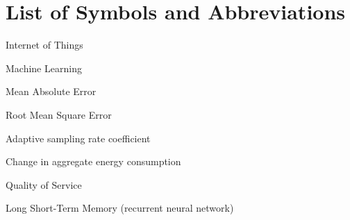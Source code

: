 \chapter*{List of Symbols and Abbreviations}
\begin{description}[leftmargin=2.6cm,style=nextline]
  \item[IoT] Internet of Things
  \item[ML] Machine Learning
  \item[MAE] Mean Absolute Error
  \item[RMSE] Root Mean Square Error
  \item[$\lambda$] Adaptive sampling rate coefficient
  \item[$\Delta E$] Change in aggregate energy consumption
  \item[QoS] Quality of Service
  \item[LSTM] Long Short-Term Memory (recurrent neural network)
\end{description}

\clearpage
{}
